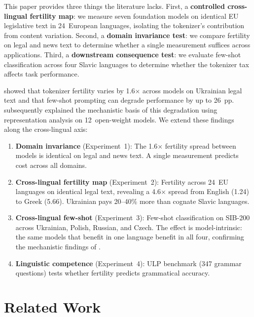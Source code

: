 \documentclass[11pt,a4paper]{article}
\begin{document}
This paper provides three things the literature lacks. First, a \textbf{controlled cross-lingual fertility map}: we measure seven foundation models on identical EU legislative text in 24~European languages, isolating the tokenizer's contribution from content variation. Second, a \textbf{domain invariance test}: we compare fertility on legal and news text to determine whether a single measurement suffices across applications. Third, a \textbf{downstream consequence test}: we evaluate few-shot classification across four Slavic languages to determine whether the tokenizer tax affects task performance.

\citet{ovcharov2026tokenizer} showed that tokenizer fertility varies by 1.6$\times$ across models on Ukrainian legal text and that few-shot prompting can degrade performance by up to 26~pp. \citet{ovcharov2026fewshot} subsequently explained the mechanistic basis of this degradation using representation analysis on 12~open-weight models. We extend these findings along the cross-lingual axis:

\begin{enumerate}[leftmargin=*]
    \item \textbf{Domain invariance} (Experiment~1): The 1.6$\times$ fertility spread between models is identical on legal and news text. A single measurement predicts cost across all domains.

    \item \textbf{Cross-lingual fertility map} (Experiment~2): Fertility across 24~EU languages on identical legal text, revealing a 4.6$\times$ spread from English (1.24) to Greek (5.66). Ukrainian pays 20--40\% more than cognate Slavic languages.

    \item \textbf{Cross-lingual few-shot} (Experiment~3): Few-shot classification on SIB-200 across Ukrainian, Polish, Russian, and Czech. The effect is model-intrinsic: the same models that benefit in one language benefit in all four, confirming the mechanistic findings of \citet{ovcharov2026fewshot}.

    \item \textbf{Linguistic competence} (Experiment~4): ULP benchmark (347 grammar questions) tests whether fertility predicts grammatical accuracy.
\end{enumerate}

\section{Related Work}
\end{document}
